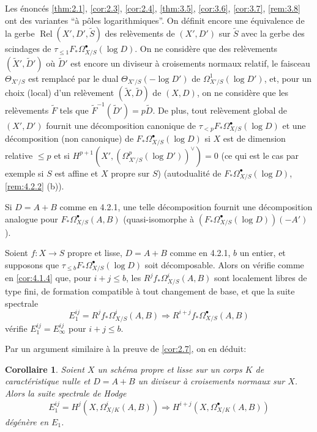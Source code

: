 \documentclass[12pt,a4paper]{article}
\theoremstyle{plain}
\newtheorem{corollary}[theorem]{Corollaire}
\theoremstyle{definition}
\theoremstyle{remark}
\DeclareMathOperator{\Rel}{Rel}
\begin{document}
\subsubsection{}

Les \'enonc\'es \ref{thm:2.1}, \ref{cor:2.3}, \ref{cor:2.4}, \ref{thm:3.5}, \ref{cor:3.6}, \ref{cor:3.7}, \ref{rem:3.8} ont des variantes ``\`a p\^oles logarithmiques''. On d\'efinit encore une \'equivalence de la gerbe $\Rel(X', D', \tilde{S})$ des rel\`evements de $(X', D')$ sur $\tilde{S}$ avec la gerbe des scindages de $\tau_{\le 1} F_* \Omega^{\bullet}_{X/S}(\log D)$. On ne consid\`ere que des rel\`evements $(\tilde{X}', \tilde{D}')$ o\`u $\tilde{D}'$ est encore un diviseur \`a croisements normaux relatif, le faisceau $\Theta_{X'/S}$ est remplac\'e par le dual $\Theta_{X'/S}(-\log D')$ de $\Omega^{1}_{X'/S}(\log D')$, et, pour un choix (local) d'un rel\`evement $(\tilde{X}, \tilde{D})$ de $(X, D)$, on ne consid\`ere que les rel\`evements $\tilde{F}$ tels que $\tilde{F}^{-1}(\tilde{D}') = p\tilde{D}$. De plus, tout rel\`evement global de $(X', D')$ fournit une d\'ecomposition canonique de $\tau_{<p} F_* \Omega^{\bullet}_{X/S}(\log D)$ et une d\'ecomposition (non canonique) de $F_* \Omega^{\bullet}_{X/S}(\log D)$ si $X$ est de dimension relative $\le p$ et si $H^{p+1}(X', (\Omega^p_{X'/S}(\log D'))^\vee) = 0$ (ce qui est le cas par exemple si $S$ est affine et $X$ propre sur $S$) (autodualit\'e de $F_* \Omega^{\bullet}_{X/S}(\log D)$, \ref{rem:4.2.2} (b)).

Si $D = A + B$ comme en 4.2.1, une telle d\'ecomposition fournit une d\'ecomposition analogue pour $F_* \Omega^{\bullet}_{X/S}(A, B)$ (quasi-isomorphe \`a $(F_* \Omega^{\bullet}_{X/S}(\log D))(-A')$).

Soient $f: X \to S$ propre et lisse, $D = A + B$ comme en 4.2.1, $b$ un entier, et supposons que $\tau_{\le b} F_* \Omega^{\bullet}_{X/S}(\log D)$ soit d\'ecomposable. Alors on v\'erifie comme en \ref{cor:4.1.4} que, pour $i + j \le b$, les $R^j f_* \Omega^i_{X/S}(A, B)$ sont localement libres de type fini, de formation compatible \`a tout changement de base, et que la suite spectrale
\[
E_1^{ij} = R^j f_* \Omega^i_{X/S}(A, B) \Rightarrow R^{i+j} f_* \Omega^{\bullet}_{X/S}(A, B)
\]
v\'erifie $E_1^{ij} = E_\infty^{ij}$ pour $i + j \le b$.

Par un argument similaire \`a la preuve de \ref{cor:2.7}, on en d\'eduit:

\begin{corollary}\label{cor:4.2.4}
Soient $X$ un sch\'ema propre et lisse sur un corps $K$ de caract\'eristique nulle et $D = A + B$ un diviseur \`a croisements normaux sur $X$. Alors la suite spectrale de Hodge
\[
E_1^{ij} = H^j(X, \Omega^i_{X/K}(A, B)) \Rightarrow H^{i+j}(X, \Omega^{\bullet}_{X/K}(A, B))
\]
d\'eg\'en\`ere en $E_1$.
\end{corollary}
\end{document}
